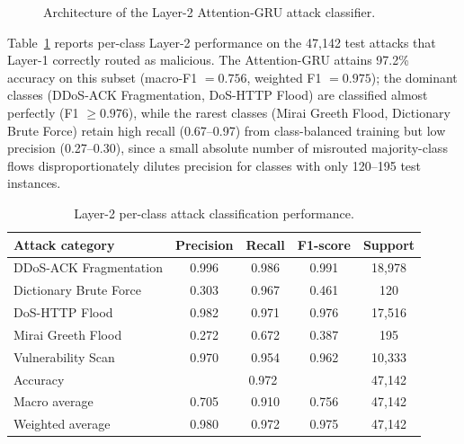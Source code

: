\documentclass{llncs}
\begin{document}
\begin{figure}[!htb]
\centering
{}
\caption{Architecture of the Layer-2 Attention-GRU attack classifier.}
\label{fig:gru}
\end{figure}

Table~\ref{tab:layer2-results} reports per-class Layer-2 performance on the 47{,}142 test attacks that Layer-1 correctly routed as malicious. The Attention-GRU attains 97.2\% accuracy on this subset (macro-F1 $=0.756$, weighted F1 $=0.975$); the dominant classes (DDoS-ACK Fragmentation, DoS-HTTP Flood) are classified almost perfectly (F1 $\geq 0.976$), while the rarest classes (Mirai Greeth Flood, Dictionary Brute Force) retain high recall (0.67--0.97) from class-balanced training but low precision (0.27--0.30), since a small absolute number of misrouted majority-class flows disproportionately dilutes precision for classes with only 120--195 test instances.

\begin{table}[!htb]
\centering
\caption{Layer-2 per-class attack classification performance.}
\label{tab:layer2-results}
\small
\begin{tabular}{lcccc}
\toprule
\textbf{Attack category} & \textbf{Precision} & \textbf{Recall} & \textbf{F1-score} & \textbf{Support} \\
\midrule
DDoS-ACK Fragmentation  & 0.996 & 0.986 & 0.991 & 18{,}978 \\
Dictionary Brute Force  & 0.303 & 0.967 & 0.461 & 120 \\
DoS-HTTP Flood          & 0.982 & 0.971 & 0.976 & 17{,}516 \\
Mirai Greeth Flood      & 0.272 & 0.672 & 0.387 & 195 \\
Vulnerability Scan      & 0.970 & 0.954 & 0.962 & 10{,}333 \\
\midrule
Accuracy                & \multicolumn{3}{c}{0.972} & 47{,}142 \\
Macro average           & 0.705 & 0.910 & 0.756 & 47{,}142 \\
Weighted average        & 0.980 & 0.972 & 0.975 & 47{,}142 \\
\bottomrule
\end{tabular}
\end{table}
\end{document}
